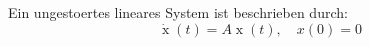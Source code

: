 Ein ungestoertes lineares System ist beschrieben durch:
$$\dot{\operatorname{x}}(t) = A \operatorname{x}(t), \quad x(0) = 0$$
